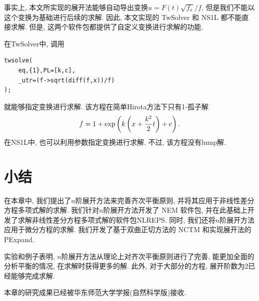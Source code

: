 事实上, 本文所实现的\Painleve{}展开法能够自动导出变换$u=F(t)\sqrt{f_x}/f$, 但是我们不能以这个变换为基础进行后续的求解.  因此, 本文实现的 TwSolver 和 NS1L 都不能直接求解. 但是, 这两个软件包都提供了自定义变换进行求解的功能.

在TwSolver中, 调用
\begin{verbatim}
twsolve(
    eq,{1},PL=[k,c],
    _utr=(f->sqrt(diff(f,x))/f)
);
\end{verbatim}
就能够指定变换进行求解. 该方程在简单Hirota方法下只有1-孤子解
\begin{equation}
    f=1+\exp\left(k\left(x+\frac{k^2}{2}t\right)+c\right).
\end{equation}
在NS1L中, 也可以利用参数指定变换进行求解. 不过, 该方程没有lump解.

\section{小结}\label{ch4sec7}

在本章中, 我们提出了$n$阶展开方法来完善齐次平衡原则, 并将其应用于非线性差分方程多项式解的求解. 我们针对$n$阶展开方法开发了 NEM 软件包, 并在此基础上开发了求解非线性差分方程多项式解的软件包NLREPS. 同时, 我们还将$n$阶展开方法应用于微分方程的求解. 我们开发了基于双曲正切方法的 NCTM 和实现\Painleve{}展开法的 PExpand. 

实验和例子表明, $n$阶展开方法从理论上对齐次平衡原则进行了完善, 能更加全面的分析平衡的情况, 在求解时获得更多的解. 此外, 对于大部分的方程, 展开阶数为2已经能够完成求解. 

本章的研究成果已经被华东师范大学学报(自然科学版)接收.
